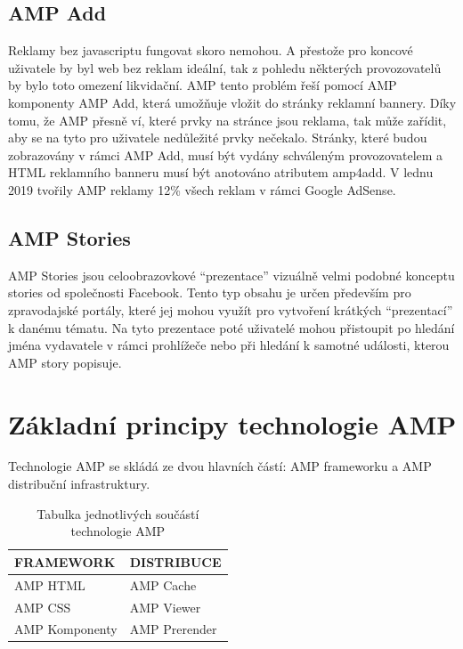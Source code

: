 \subsection*{AMP Add}
Reklamy bez javascriptu fungovat skoro nemohou. A přestože pro koncové uživatele by byl web bez reklam ideální, tak z pohledu některých provozovatelů by bylo toto omezení likvidační. AMP tento problém řeší pomocí AMP komponenty AMP Add, která umožňuje vložit do stránky reklamní bannery. Díky tomu, že AMP přesně ví, které prvky na stránce jsou reklama, tak může zařídit, aby se na tyto pro uživatele nedůležité prvky nečekalo. Stránky, které budou zobrazovány v rámci AMP Add, musí být vydány schváleným provozovatelem a HTML reklamního banneru musí být anotováno atributem amp4add\cite[Ch.\ 6, p.\ 280]{VzhuruDoAMP}.
V lednu 2019 tvořily AMP reklamy 12\% všech reklam v rámci Google AdSense\cite{abner_2019}.
\subsection*{AMP Stories}
AMP Stories jsou celoobrazovkové “prezentace” vizuálně velmi podobné konceptu stories od společnosti Facebook. Tento typ obsahu je určen především pro zpravodajské portály, které jej mohou využít pro vytvoření krátkých
“prezentací” k danému tématu. Na tyto prezentace poté uživatelé mohou přistoupit po hledání jména
vydavatele v rámci prohlížeče nebo při hledání k samotné události, kterou AMP story popisuje\cite[Ch.\ 6, p.\ 290]{VzhuruDoAMP}.

\section{Základní principy technologie AMP}
Technologie AMP se skládá ze dvou hlavních částí: AMP frameworku a AMP distribuční infrastruktury. 

\begin{table}[H]
	\caption{Tabulka jednotlivých součástí technologie AMP} 
	\centering
	\begin{tabular}{m{15em} | m{15em}}
		\toprule
		\cmidrule(r){1-2}
		FRAMEWORK & DISTRIBUCE \\
		\midrule
		AMP HTML & AMP Cache \\
		AMP CSS & AMP Viewer \\
		AMP Komponenty & AMP Prerender \\
		\bottomrule
	\end{tabular}
	\label{tab:Součásti technologie AMP}
\end{table}

